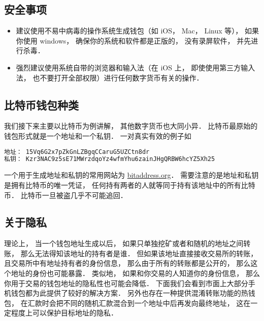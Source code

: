 
\subsection{安全事项}
\begin{itemize}
\item 建议使用不易中病毒的操作系统生成钱包（如 iOS， Mac， Linux 等）， 如果你使用 windows， 确保你的系统和软件都是正版的， 没有录屏软件， 并先进行杀毒．
\item 强烈建议使用系统自带的浏览器和输入法（在 iOS 上， 即使使用第三方输入法， 也不要打开全部权限）进行任何数字货币有关的操作．
\end{itemize}

\subsection{比特币钱包种类}
我们接下来主要以比特币为例讲解， 其他数字货币也大同小异． 比特币最原始的钱包形式就是一个地址和一个私钥． 一对真实有效的例子如
\begin{lstlisting}[language=bash]
地址： 15Vq6G2x7pZkGnLZBgqCCaruG5UZCtn8dr
私钥： Kzr3NAC9z5sE71MWrzdqoYz4wfmYhu6zainJHgQRBW6hcYZ5Xh25
\end{lstlisting}
一个用于生成地址和私钥的常用网站为 \href{https://www.bitaddress.org/}{bitaddress.org}． 需要注意的是地址和私钥是拥有比特币的唯一凭证， 任何持有两者的人就等同于持有该地址中的所有比特币． 比特币一旦被盗几乎不可能追回．

\subsection{关于隐私}
理论上， 当一个钱包地址生成以后， 如果只单独挖矿或者和随机的地址之间转账， 那么无法得知该地址的持有者是谁． 但如果该地址直接接收交易所的转账， 且交易所中有地址持有者的身份信息， 那么由于所有的转账都是公开的， 那么这个地址的身份也可能暴露． 类似地， 如果和你交易的人知道你的身份信息， 那么你用于交易的钱包地址的隐私性也可能会降低． 下面我们会看到市面上大部分手机钱包都为此提供了较好的解决方案． 另外也存在一种提供混淆转账功能的热钱包， 在汇款时会把不同的随机汇款混合到一个地址中后再发向最终地址， 这在一定程度上可以保护目标地址的隐私．

